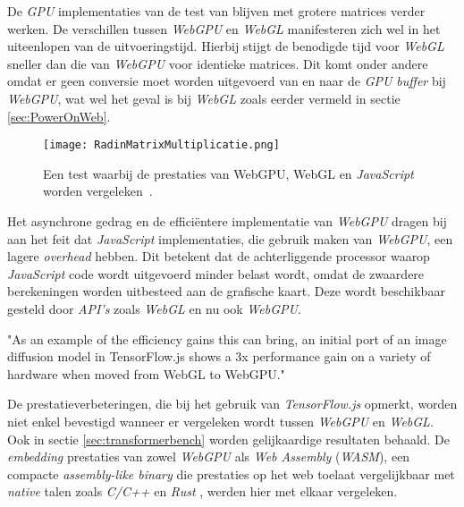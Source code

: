 \bigbreak{}

De \textit{GPU} implementaties van de test van \textcite{Radin2021} blijven met grotere matrices verder werken. De verschillen tussen \textit{WebGPU} en \textit{WebGL} manifesteren zich wel in het uiteenlopen van de uitvoeringstijd. Hierbij stijgt de benodigde tijd voor \textit{WebGL} sneller dan die van \textit{WebGPU} voor identieke matrices. Dit komt onder andere omdat er geen conversie moet worden uitgevoerd van en naar de \textit{GPU buffer} bij \textit{WebGPU}, wat wel het geval is bij \textit{WebGL} zoals eerder vermeld in sectie \ref{sec:PowerOnWeb}. 

\break{}

\begin{figure}
    \texttt{[image: RadinMatrixMultiplicatie.png]}
    \caption[Matrixvermenigvuldiging test~\autocite{Radin2021}]{Een test waarbij de prestaties van WebGPU, WebGL en \textit{JavaScript} worden vergeleken~\autocite{Radin2021}.}
    \label{fig:Matrix Multiplication By Radin}
\end{figure}

Het asynchrone gedrag en de efficiëntere implementatie van \textit{WebGPU} dragen bij aan het feit dat \textit{JavaScript} implementaties, die gebruik maken van \textit{WebGPU}, een lagere \textit{overhead} hebben. Dit betekent dat de achterliggende processor waarop \textit{JavaScript} code wordt uitgevoerd minder  belast wordt, omdat de zwaardere berekeningen worden uitbesteed aan de grafische kaart. Deze wordt beschikbaar gesteld door \textit{API's} zoals \textit{WebGL} en nu ook \textit{WebGPU}.

\begin{displayquote}
    "As an example of the efficiency gains this can bring, an initial port of an image diffusion model in TensorFlow.js shows a 3x performance gain on a variety of hardware when moved from WebGL to WebGPU."
\end{displayquote}

De prestatieverbeteringen, die \textcite{Wallez2023} bij het gebruik van \textit{TensorFlow.js} opmerkt, worden niet enkel bevestigd wanneer er vergeleken wordt tussen \textit{WebGPU} en \textit{WebGL}. Ook in sectie \ref{sec:transformerbench} worden gelijkaardige resultaten behaald. De \textit{embedding} prestaties van zowel \textit{WebGPU} als \textit{Web Assembly} (\textit{WASM}), een compacte \textit{assembly-like binary} die prestaties op het web toelaat vergelijkbaar met \textit{native} talen zoals \textit{C/C++} en \textit{Rust} \autocite{Steiner2023}, werden hier met elkaar vergeleken.

